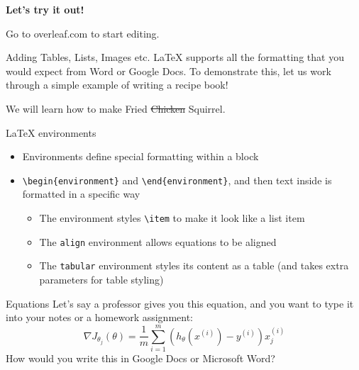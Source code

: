 \documentclass{beamer}
\begin{document}
\begin{frame}{}
\par\bigskip
  \vspace*{\fill}
  {\Large\bfseries Let's try it out!}\par\smallskip
  Go to overleaf.com to start editing.
  \vspace*{\fill}
\end{frame}

\begin{frame}{Adding Tables, Lists, Images etc.}
    \LaTeX{} supports all the formatting that you would expect from Word or Google Docs. To demonstrate this, let us work through a simple example of writing a recipe book! \newline
    
    We will learn how to make Fried \sout{Chicken} Squirrel.
\end{frame}

\begin{frame}{\LaTeX{} environments}
    \begin{itemize}
        \item Environments define special formatting within a block
        \item \texttt{\ttfamily \textbackslash begin\{environment\}} and \texttt{\ttfamily \textbackslash end\{environment\}}, and then text inside is formatted in a specific way
        \begin{itemize}
            \item The  environment styles \texttt{\ttfamily \textbackslash item} to make it look like a list item
            \item The \texttt{align} environment allows equations to be aligned
            \item The \texttt{tabular} environment styles its content as a table (and takes extra parameters for table styling)
        \end{itemize}
    \end{itemize}
\end{frame}

\begin{frame}{Equations}
    Let's say a professor gives you this equation, and you want to type it into your notes or a homework assignment:
    \begin{equation*}
    \nabla J_{\theta_j}(\theta)=\frac1m\sum_{i=1}^{m}(h_\theta(x^{(i)})-y^{(i)})x_{j}^{(i)}
    \end{equation*}
    How would you write this in Google Docs or Microsoft Word?
\end{frame}
\end{document}
